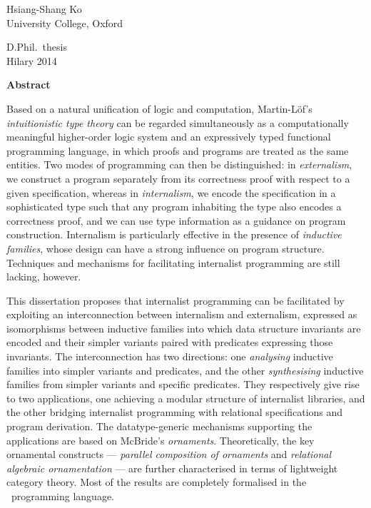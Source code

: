 \documentclass[dissertation]{subfiles}
\begin{document}

\thispagestyle{empty}

\hypertarget{abstract}{}

\begin{center}


Hsiang-Shang Ko\\
University College, Oxford

D.Phil.~thesis\\
Hilary 2014

\end{center}

\noindent\hfil\textbf{Abstract}\hfil

\noindent
Based on a natural unification of logic and computation, Martin-Löf's \textit{intuitionistic type theory} can be regarded simultaneously as a computationally meaningful higher-order logic system and an expressively typed functional programming language, in which proofs and programs are treated as the same entities.
Two modes of programming can then be distinguished: in \textit{externalism}, we construct a program separately from its correctness proof with respect to a given specification, whereas in \textit{internalism}, we encode the specification in a sophisticated type such that any program inhabiting the type also encodes a correctness proof, and we can use type information as a guidance on program construction.
Internalism is particularly effective in the presence of \textit{inductive families}, whose design can have a strong influence on program structure.
Techniques and mechanisms for facilitating internalist programming are still lacking, however.

This dissertation proposes that internalist programming can be facilitated by exploiting an interconnection between internalism and externalism, expressed as isomorphisms between inductive families into which data structure invariants are encoded and their simpler variants paired with predicates expressing those invariants.
The interconnection has two directions: one \textit{analysing} inductive families into simpler variants and predicates, and the other \textit{synthesising} inductive families from simpler variants and specific predicates.
They respectively give rise to two applications, one achieving a modular structure of internalist libraries, and the other bridging internalist programming with relational specifications and program derivation.
The datatype-generic mechanisms supporting the applications are based on McBride's \textit{ornaments}.
Theoretically, the key ornamental constructs --- \textit{parallel composition of ornaments} and \textit{relational algebraic ornamentation} --- are further characterised in terms of lightweight category theory.
Most of the results are completely formalised in the \Agda\ programming language.
\end{document}
